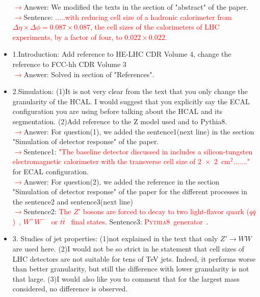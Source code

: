 \documentclass[final,1p,11pt]{elsarticle}
\newcommand{\pythia} {\textsc{Pythia8~}}
\begin{document}
\begin{itemize}
 \textcolor{red}{$\rightarrow$}Answer: We modified the texts in the section of "abstract" of the paper.\\
 \textcolor{red}{$\rightarrow$}Sentence: \textcolor{red}{.....with reducing cell size of a hadronic calorimeter from $\Delta \eta \times \Delta \phi = 0.087\times0.087$, the cell sizes of the calorimeters of LHC experiments, by a factor of four, to  $0.022\times0.022$.} 
\item 1.Introduction: Add reference to HE-LHC CDR Volume 4, change the reference to FCC-hh CDR Volume 3\\
 \textcolor{red}{$\rightarrow$}Answer: Solved in section of "References".
\item 2.Simulation: (1)It is not very clear from the text that you only change the granularity of the HCAL. I would suggest that you explicitly say the ECAL configuration you are using before talking about the HCAL and its segmentation.
(2)Add reference to the Z model used and to Pythia8.\\
 \textcolor{red}{$\rightarrow$}Answer: For question(1), we added the sentence1(next line) in the section "Simulation of detector response" of the paper.\\
 \textcolor{red}{$\rightarrow$}Sentence1: \textcolor{red}{"The baseline detector discussed in \cite{Chekanov:2016ppq}
includes a silicon-tungsten electromagnetic calorimeter with the transverse cell size of 2~$\times$~2~cm$^2$......."} for ECAL configuration.\\
 \textcolor{red}{$\rightarrow$}Answer: For question(2), we added the reference in the section "Simulation of detector response" of the paper for the different processes in the sentence2 and sentence3(next line)\\
\textcolor{red}{$\rightarrow$}Sentence2:  \textcolor{red}{The $Z'$ bosons are forced to decay to two light-flavor quark ($q\bar{q}$)~\cite{Sirunyan:2018xlo}, $W^+W^-$~\cite{Sirunyan:2017acf} or $t\bar{t}$~\cite{Sirunyan:2018ryr} final states}. Sentence3: \textcolor{red}{\pythia generator~\cite{Sjostrand:2006za}}.\\
\item 3. Studies of jet properties: (1)not explained in the text that only $Z' \rightarrow WW$ are used here. (2)I would not be so strict in he statement that cell sizes of LHC detectors are not suitable for tens of TeV jets. Indeed, it performs worse than better granularity, but still the difference with lower granularity is not that large. (3)I would also like you to comment that for the largest mass considered, no difference is observed.\\

\end{itemize}
\end{document}
